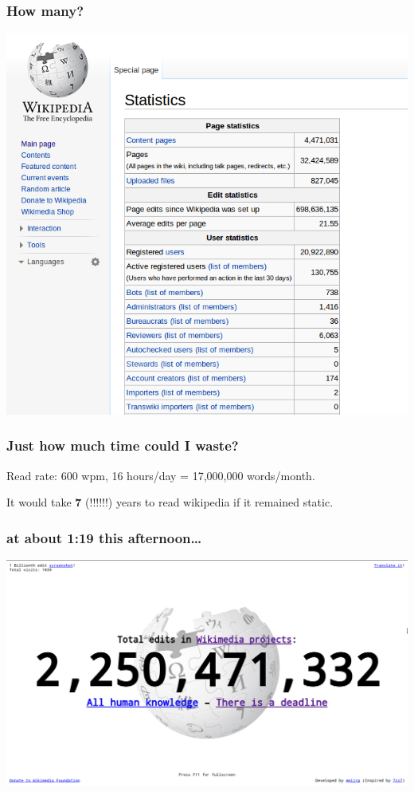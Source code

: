 \documentclass{beamer}
\begin{document}
\begin{frame}
  \frametitle{How many?}
  \begin{center}
    \includegraphics[height = 0.8\textheight, keepaspectratio = true]{figure/wiki_stats}
  \end{center}
\end{frame}

\begin{frame}
  \frametitle{Just how much time could I waste?}

  Read rate: 600 wpm, 16 hours/day = 17,000,000 words/month. 
  
  \vspace{1cm}

  It would take \textbf{7} (!!!!!!) years to read wikipedia if it remained static. 
\end{frame}

\begin{frame}
  \frametitle{at about 1:19 this afternoon\ldots}
  \begin{center}
    \includegraphics[height = 0.8\textheight, width = \textwidth, keepaspectratio = true]{figure/edits}
  \end{center}
\end{frame}
\end{document}
